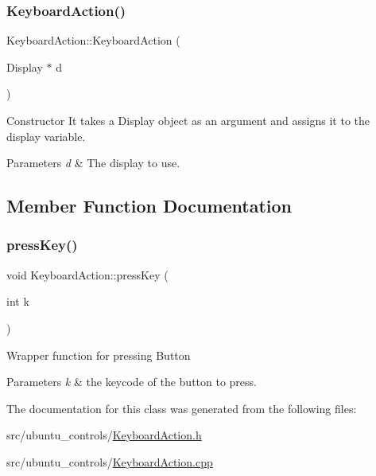 \subsubsection{\texorpdfstring{Keyboard\+Action()}{KeyboardAction()}}
{\footnotesize\ttfamily Keyboard\+Action\+::\+Keyboard\+Action (\begin{DoxyParamCaption}\item[{Display $\ast$}]{d }\end{DoxyParamCaption})}

Constructor It takes a Display object as an argument and assigns it to the display variable.


\begin{DoxyParams}{Parameters}
{\em d} & The display to use. \\
\hline
\end{DoxyParams}


\subsection{Member Function Documentation}
\mbox{\label{classKeyboardAction_ab09e3956685d6fb11cd1cdf86a673b48}} 
\subsubsection{\texorpdfstring{press\+Key()}{pressKey()}}
{\footnotesize\ttfamily void Keyboard\+Action\+::press\+Key (\begin{DoxyParamCaption}\item[{int}]{k }\end{DoxyParamCaption})}

Wrapper function for pressing Button


\begin{DoxyParams}{Parameters}
{\em k} & the keycode of the button to press. \\
\hline
\end{DoxyParams}


The documentation for this class was generated from the following files\+:\begin{DoxyCompactItemize}
\item 
src/ubuntu\+\_\+controls/\hyperlink{KeyboardAction_8h}{Keyboard\+Action.\+h}\item 
src/ubuntu\+\_\+controls/\hyperlink{KeyboardAction_8cpp}{Keyboard\+Action.\+cpp}\end{DoxyCompactItemize}
